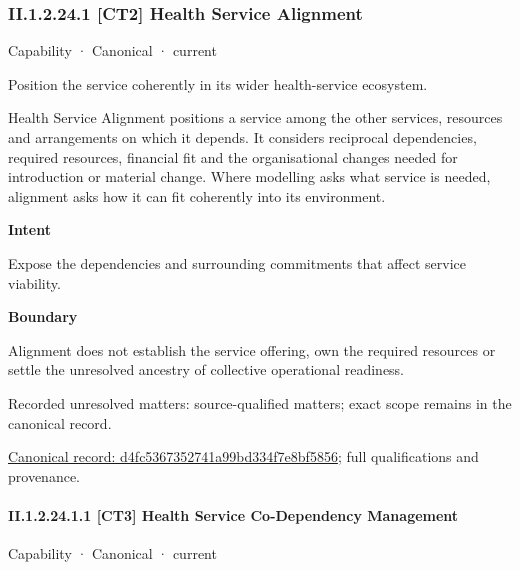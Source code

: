 \subsubsection*{II.1.2.24.1 [CT2] Health Service Alignment}
\label{navigation:II.1.2.24.1}

\label{element:d4fc5367352741a99bd334f7e8bf5856}
{\small Capability · Canonical · current}\par

Position the service coherently in its wider health-service ecosystem.



Health Service Alignment positions a service among the other services, resources and arrangements on which it depends. It considers reciprocal dependencies, required resources, financial fit and the organisational changes needed for introduction or material change. Where modelling asks what service is needed, alignment asks how it can fit coherently into its environment.



\textbf{Intent}



Expose the dependencies and surrounding commitments that affect service viability.



\textbf{Boundary}



Alignment does not establish the service offering, own the required resources or settle the unresolved ancestry of collective operational readiness.


{\small Recorded unresolved matters: source-qualified matters; exact scope remains in the canonical record.}\par
{\footnotesize \href{../../../../continuum/strategy/capability/d4fc5367352741a99bd334f7e8bf5856.md}{Canonical record: d4fc5367352741a99bd334f7e8bf5856}; full qualifications and provenance.}\par
\paragraph*{II.1.2.24.1.1 [CT3] Health Service Co-Dependency Management}
\label{navigation:II.1.2.24.1.1}

\label{element:f031ee3ddc5e47c48d4308d4077b3967}
{\small Capability · Canonical · current}\par

